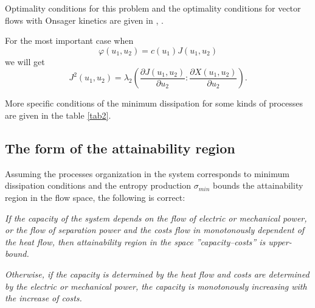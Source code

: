 \documentclass[epjST]{svjour}
\begin{document}
Optimality conditions for this problem and the optimality conditions for vector flows with Onsager kinetics are given in \cite{TsMir}, \cite{TsKaz}.

For the most important case when
\begin{equation}
\varphi(u_1, u_2) = c(u_1)J(u_1, u_2)
\label{MinDisImpCond}
\end{equation}
we will get
\begin{equation}
J^2(u_1, u_2)= \lambda_2\left(\frac{\partial J(u_1, u_2)}{\partial u_2}:\frac{\partial X(u_1, u_2)}{\partial u_2}\right).
\label{MinDisImp}
\end{equation}

More specific conditions of the minimum dissipation for some kinds of processes are given in the table \ref{tab2}.


\subsection*{The form of the attainability region}

Assuming the processes organization in the system corresponds to minimum dissipation conditions and the entropy production $\sigma_{min}$ bounds the attainability region in the flow space, the following is correct\cite{TsGrig}:

\textit{If the capacity of the system depends on the flow of electric or mechanical power, or the flow of separation power and the costs flow in monotonously dependent of the heat flow, then attainability region in the space ''capacity--costs'' is upper-bound.}

\textit{Otherwise, if the capacity is determined by the heat flow and costs are determined by the electric or mechanical power, the capacity is monotonously increasing with the increase of costs.}
\end{document}
